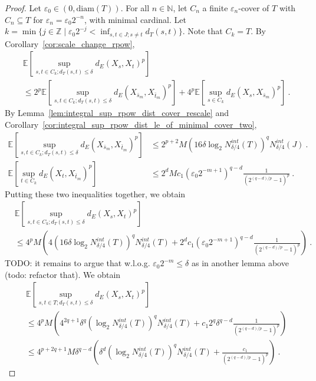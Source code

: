 \begin{proof}
Let $\varepsilon_0 \in (0, \mathrm{diam}(T))$.
For all $n \in \mathbb{N}$, let $C_n$ a finite $\varepsilon_n$-cover of $T$ with $C_n \subseteq T$ for $\varepsilon_n = \varepsilon_0 2^{-n}$, with minimal cardinal.
Let $k = \min \{j \in \mathbb{Z} \mid \varepsilon_0 2^{-j} < \inf_{s, t \in J; s \ne t}d_T(s, t)\}$.
Note that $C_k = T$.
By Corollary~\ref{cor:scale_change_rpow},
\begin{align*}
  &\mathbb{E}\left[ \sup_{s, t \in C_k; d_T(s, t) \le \delta} d_E(X_s, X_t)^p \right]
  \\
  &\le 2^p \mathbb{E}\left[ \sup_{s, t \in C_k; d_T(s, t) \le \delta} d_E(X_{\bar{s}_m}, X_{\bar{t}_m})^p \right]
    + 4^p \mathbb{E}\left[ \sup_{s \in C_k} d_E(X_s, X_{\bar{s}_m})^p \right]
  \: .
\end{align*}
By Lemma~\ref{lem:integral_sup_rpow_dist_cover_rescale} and Corollary~\ref{cor:integral_sup_rpow_dist_le_of_minimal_cover_two},
\begin{align*}
  \mathbb{E} \left[ \sup_{s, t \in C_k; d_T(s, t) \le \delta} d_E(X_{\bar{s}_m}, X_{\bar{t}_m})^p \right]
  &\le 2^{p+2} M \left(16 \delta \log_2 N^{int}_{\delta/4}(T) \right)^q  N^{int}_{\delta/4}(J)
  \: . \\
  \mathbb{E} \left[\sup_{t \in C_k} d_E(X_t, X_{\bar{t}_m})^p \right]
  &\le2^d M c_1 (\varepsilon_0 2^{-m+1})^{q - d} \frac{1}{\left( 2^{(q -d)/p} - 1\right)^p}
  \: .
\end{align*}
Putting these two inequalities together, we obtain
\begin{align*}
  &\mathbb{E}\left[ \sup_{s, t \in C_k; d_T(s, t) \le \delta} d_E(X_s, X_t)^p \right]
  \\
  &\le 4^p M \left(4\left(16 \delta \log_2 N^{int}_{\delta/4}(T) \right)^q  N^{int}_{\delta/4}(T)
    + 2^d c_1 (\varepsilon_0 2^{-m+1})^{q - d} \frac{1}{\left(2^{(q -d)/p} - 1\right)^p}\right)
  \: .
\end{align*}
TODO: it remains to argue that w.l.o.g. $\varepsilon_0 2^{-m} \le \delta$ as in another lemma above (todo: refactor that).
We obtain
\begin{align*}
  &\mathbb{E}\left[ \sup_{s, t \in T; d_T(s, t) \le \delta} d_E(X_s, X_t)^p \right]
  \\
  &\le 4^p M \left(4^{2q+1}\delta^q \left(\log_2 N^{int}_{\delta/4}(T) \right)^q  N^{int}_{\delta/4}(T)
    + c_1 2^q \delta^{q - d} \frac{1}{\left( 2^{(q -d)/p} - 1\right)^p}\right)
  \\
  &\le 4^{p+2q+1} M \delta^{q-d} \left(\delta^d \left(\log_2 N^{int}_{\delta/4}(T) \right)^q  N^{int}_{\delta/4}(T)
    + \frac{c_1}{\left( 2^{(q -d)/p} - 1\right)^p}\right)
  \: .
\end{align*}
\end{proof}



